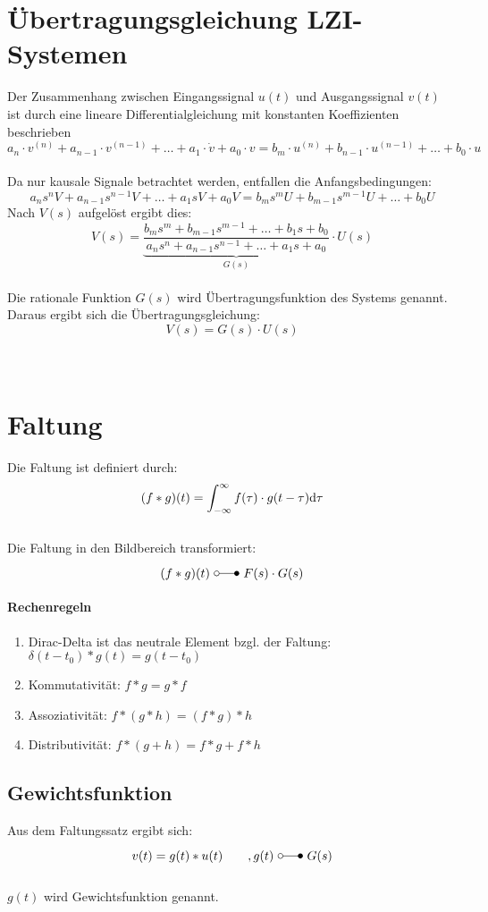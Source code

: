 \section{Übertragungsgleichung LZI-Systemen}
Der Zusammenhang zwischen Eingangssignal $u(t)$ und Ausgangssignal $v(t)$ ist durch eine lineare Differentialgleichung mit konstanten Koeffizienten beschrieben
\[
	a_n\cdot v^{(n)} + a_{n-1} \cdot v^{(n-1)} + \ldots + a_1 \cdot \dot{v} +a_0\cdot v = b_m\cdot u^{(n)} + b_{n-1} \cdot u^{(n-1)} + \ldots + b_0 \cdot u 
\]
\\
Da nur kausale Signale betrachtet werden, entfallen die Anfangsbedingungen:
\[
	a_ns^nV+a_{n-1}s^{n-1}V+\ldots+a_1sV+a_0V=b_ms^mU+b_{m-1}s^{m-1}U+\ldots+b_0U
\]
Nach $V(s)$ aufgelöst ergibt dies:
\[
	V(s)=\underbrace{\frac{b_ms^m + b_{m-1}s^{m-1}+\ldots+b_1s + b_0}{a_ns^n + a_{n-1}s^{n-1}+\ldots+a_1s + a_0}}_{G(s)} \cdot U(s)
\]
\\
Die rationale Funktion $G(s)$ wird Übertragungsfunktion des Systems genannt. Daraus ergibt sich die Übertragungsgleichung:
\[
	V(s) = G(s) \cdot U(s)
\]
\\\\

\section{Faltung}
Die Faltung ist definiert durch:
\[
	(f \ast g)(t) = \int_{-\infty}^{\infty}f(\tau) \cdot g(t-\tau) \mathrm{d} \tau
\]
\\
Die Faltung in den Bildbereich transformiert:
\[
	(f \ast g)(t) \ \laplace \ F(s) \cdot G(s)
\]

\paragraph{Rechenregeln}
\begin{enumerate}
	\item Dirac-Delta ist das neutrale Element bzgl. der Faltung: $\delta(t-t_0) \ast g(t) = g(t-t_0)$
	\item Kommutativität: $f\ast g = g \ast f$
	\item Assoziativität: $f \ast (g \ast h) = (f \ast g) \ast h$
	\item Distributivität: $f \ast (g + h) = f \ast g + f \ast h$
\end{enumerate}

\subsection{Gewichtsfunktion}
Aus dem Faltungssatz ergibt sich:
\[
	v(t) = g(t) \ast u(t) \qquad , g(t) \ \laplace \ G(s)
\]
\\
$g(t)$ wird Gewichtsfunktion genannt.
\\

